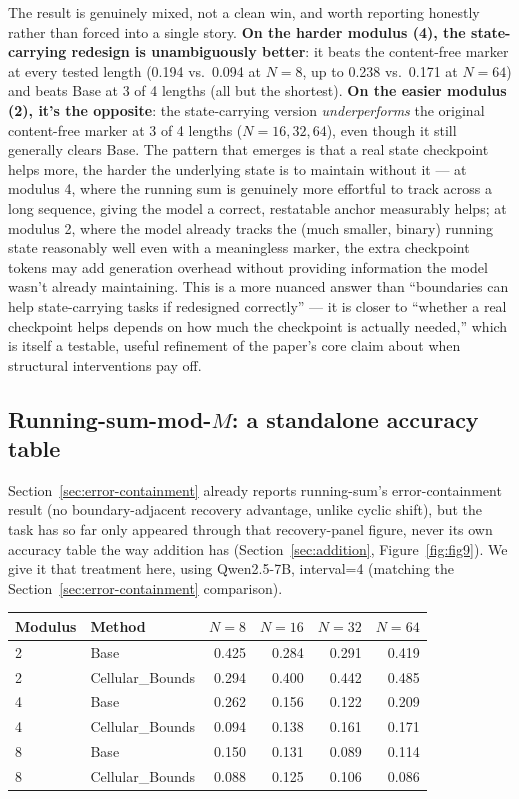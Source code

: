 \documentclass[11pt]{article}
\begin{document}
The result is genuinely mixed, not a clean win, and worth reporting honestly rather than forced into a single story. \textbf{On the harder modulus (4), the state-carrying redesign is unambiguously better}: it beats the content-free marker at every tested length (0.194 vs.\ 0.094 at $N=8$, up to 0.238 vs.\ 0.171 at $N=64$) and beats Base at 3 of 4 lengths (all but the shortest). \textbf{On the easier modulus (2), it's the opposite}: the state-carrying version \emph{underperforms} the original content-free marker at 3 of 4 lengths ($N=16, 32, 64$), even though it still generally clears Base. The pattern that emerges is that a real state checkpoint helps more, the harder the underlying state is to maintain without it --- at modulus 4, where the running sum is genuinely more effortful to track across a long sequence, giving the model a correct, restatable anchor measurably helps; at modulus 2, where the model already tracks the (much smaller, binary) running state reasonably well even with a meaningless marker, the extra checkpoint tokens may add generation overhead without providing information the model wasn't already maintaining. This is a more nuanced answer than ``boundaries can help state-carrying tasks if redesigned correctly'' --- it is closer to ``whether a real checkpoint helps depends on how much the checkpoint is actually needed,'' which is itself a testable, useful refinement of the paper's core claim about when structural interventions pay off.

\subsection{Running-sum-mod-$M$: a standalone accuracy table}

Section~\ref{sec:error-containment} already reports running-sum's error-containment result (no boundary-adjacent recovery advantage, unlike cyclic shift), but the task has so far only appeared through that recovery-panel figure, never its own accuracy table the way addition has (Section~\ref{sec:addition}, Figure~\ref{fig:fig9}). We give it that treatment here, using Qwen2.5-7B, interval=4 (matching the Section~\ref{sec:error-containment} comparison).

\begin{table}[htbp]
\centering
\small
\begin{tabular}{llrrrr}
\toprule
Modulus & Method & $N{=}8$ & $N{=}16$ & $N{=}32$ & $N{=}64$ \\
\midrule
2 & Base & 0.425 & 0.284 & 0.291 & 0.419 \\
2 & Cellular\_Bounds & 0.294 & 0.400 & 0.442 & 0.485 \\
4 & Base & 0.262 & 0.156 & 0.122 & 0.209 \\
4 & Cellular\_Bounds & 0.094 & 0.138 & 0.161 & 0.171 \\
8 & Base & 0.150 & 0.131 & 0.089 & 0.114 \\
8 & Cellular\_Bounds & 0.088 & 0.125 & 0.106 & 0.086 \\
\bottomrule
\end{tabular}
\end{table}
\end{document}
